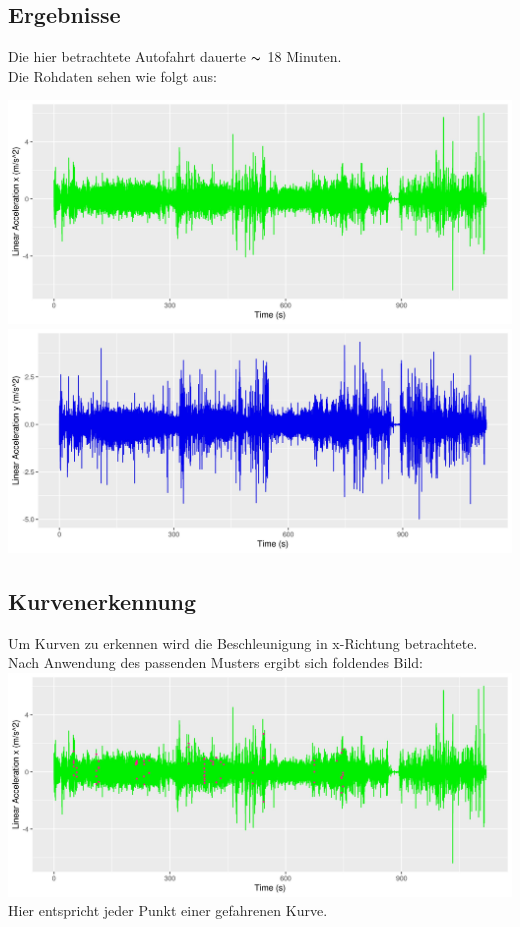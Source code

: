 \documentclass{article}
\begin{document}
\begin{multicols*}{3}
   \section*{Ergebnisse}
   Die hier betrachtete Autofahrt dauerte $\thicksim$ 18 Minuten.\\
   Die Rohdaten sehen wie folgt aus:\\
   \begin{center}
      \includegraphics[width=\linewidth]{../images/Calculations_cell_2_output_0}
      \includegraphics[width=\linewidth]{../images/Calculations_cell_3_output_0}
   \end{center}
   \subsection*{Kurvenerkennung}
   Um Kurven zu erkennen wird die Beschleunigung in x-Richtung betrachtete. Nach Anwendung des passenden Musters ergibt sich foldendes Bild:
   \includegraphics[width=\linewidth]{../images/Calculations_cell_7_output_1}
   Hier entspricht jeder Punkt einer gefahrenen Kurve.
   \vfill\null
   \columnbreak

\end{multicols*}
\end{document}
